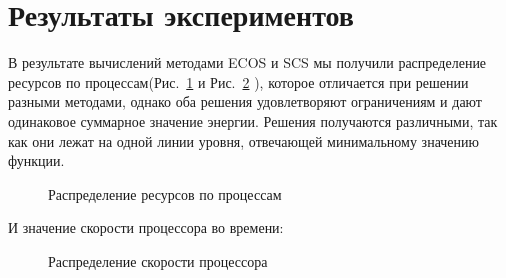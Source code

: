\documentclass{article}
\begin{document}
\section{Результаты экспериментов}

В результате вычислений методами ECOS и SCS мы получили распределение ресурсов по процессам(Рис.~\ref{ris:pow} и Рис.~\ref{ris:speed} ), которое  отличается при решении разными методами, однако оба решения удовлетворяют ограничениям и дают одинаковое суммарное значение энергии. Решения получаются различными, так как они лежат на одной линии уровня, отвечающей минимальному значению функции.\\

\centering
\begin{figure}[ht]
\caption{Распределение ресурсов по процессам}
\label{ris:pow}
\end{figure}

И значение скорости процессора во времени:\\

\centering
\begin{figure}[ht]
\caption{Распределение скорости процессора}
\label{ris:speed}
\end{figure}
\end{document}
